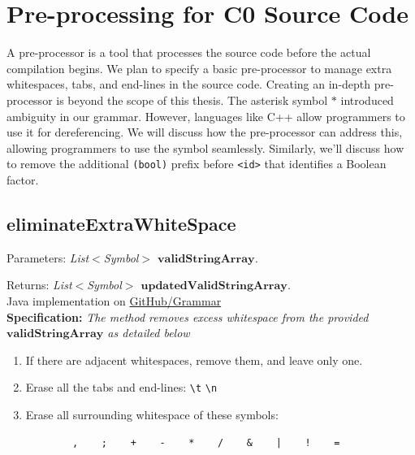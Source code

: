
\newpage


\section{Pre-processing for C0 Source Code}\label{sec:Pre-processing for C0 Source Code}

A pre-processor is a tool that processes the source code before the actual compilation begins. We plan to specify a basic pre-processor to manage extra whitespaces, tabs, and end-lines in the source code. Creating an in-depth pre-processor is beyond the scope of this thesis. The asterisk symbol \(\ast\) introduced ambiguity in our grammar. However, languages like C++ allow programmers to use it for dereferencing. We will discuss how the pre-processor can address this, allowing programmers to use the symbol seamlessly. Similarly, we'll discuss how to remove the additional \texttt{(bool)} prefix before \texttt{<id>} that identifies a Boolean factor.

\vspace{10pt}

\subsection{eliminateExtraWhiteSpace}

Parameters: \textit{List\(<\)Symbol\(>\) \(\boldsymbol{validStringArray}\).}

Returns: \textit{List\(<\)Symbol\(>\) \(\boldsymbol{updatedValidStringArray}\).}\\

Java implementation on \href{https://github.com/fyfsb/dcfg/blob/main/src/main/java/grammar/Grammar.java}{GitHub/Grammar}\\

\textbf{Specification:} \textit{The method removes excess whitespace from the provided \(\boldsymbol{validStringArray}\) as detailed below}\\

\begin{enumerate}
    \item If there are adjacent whitespaces, remove them, and leave only one.
    \item Erase all the tabs and end-lines: \texttt{\textbackslash  t} \texttt{\textbackslash  n}
    \item Erase all surrounding whitespace of these symbols:
    \begin{verbatim}
        ,    ;    +    -    *    /    &    |    !    =
    \end{verbatim}
\end{enumerate}

